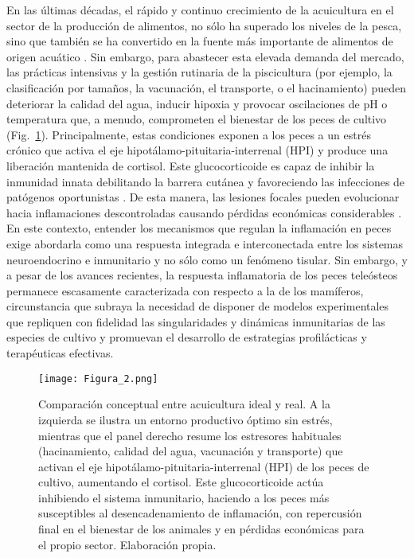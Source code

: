 \documentclass[10pt,a4paper]{article}
\begin{document}
En las últimas décadas, el rápido y continuo crecimiento de la acuicultura en el sector de la producción de alimentos, no sólo ha superado los niveles de la pesca, sino que también se ha convertido en la fuente más importante de alimentos de origen acuático \parencite{FAO2024}. Sin embargo, para abastecer esta elevada demanda del mercado, las prácticas intensivas y la gestión rutinaria de la piscicultura (por ejemplo, la clasificación por tamaños, la vacunación, el transporte, o el hacinamiento) pueden deteriorar la calidad del agua, inducir hipoxia y provocar oscilaciones de pH o temperatura que, a menudo, comprometen el bienestar de los peces de cultivo \parencite{Saraiva2022} (Fig.~\ref{fig:2}). Principalmente, estas condiciones exponen a los peces a un estrés crónico que activa el eje hipotálamo-pituitaria-interrenal (HPI) y produce una liberación mantenida de cortisol. Este glucocorticoide es capaz de inhibir la inmunidad innata debilitando la barrera cutánea y favoreciendo las infecciones de patógenos oportunistas \parencite{Azeredo2022}. De esta manera, las lesiones focales pueden evolucionar hacia inflamaciones descontroladas causando pérdidas económicas considerables \parencite{Balcazar2006,Esteban2012}. En este contexto, entender los mecanismos que regulan la inflamación en peces exige abordarla como una respuesta integrada e interconectada entre los sistemas neuroendocrino e inmunitario y no sólo como un fenómeno tisular. Sin embargo, y a pesar de los avances recientes, la respuesta inflamatoria de los peces teleósteos permanece escasamente caracterizada con respecto a la de los mamíferos, circunstancia que subraya la necesidad de disponer de modelos experimentales que repliquen con fidelidad las singularidades y dinámicas inmunitarias de las especies de cultivo y promuevan el desarrollo de estrategias profilácticas y terapéuticas efectivas.


\begin{figure}[ht]
  \centering
   \texttt{[image: Figura\_2.png]}

  \caption{Comparación conceptual entre acuicultura ideal y real. A la izquierda se ilustra un entorno productivo óptimo sin estrés, mientras que el panel derecho resume los estresores habituales (hacinamiento, calidad del agua, vacunación y transporte) que activan el eje hipotálamo-pituitaria-interrenal (HPI) de los peces de cultivo, aumentando el cortisol. Este glucocorticoide actúa inhibiendo el sistema inmunitario, haciendo a los peces más susceptibles al desencadenamiento de inflamación, con repercusión final en el bienestar de los animales y en pérdidas económicas para el propio sector. Elaboración propia.}
  \label{fig:2}
\end{figure}
\end{document}
